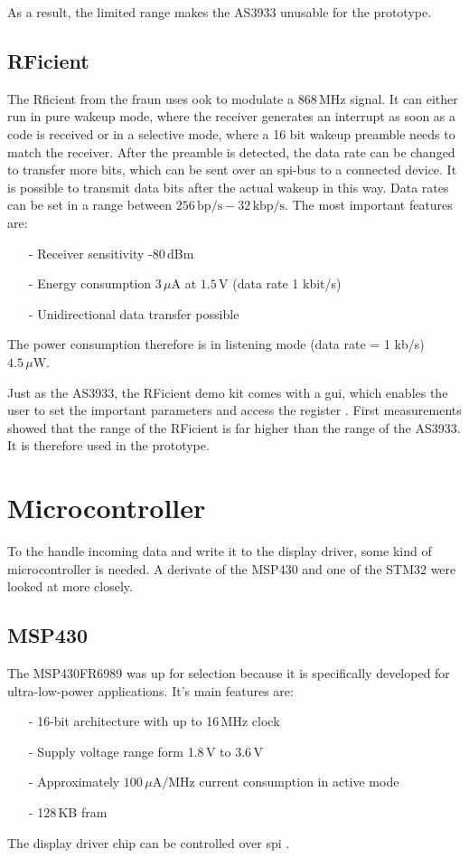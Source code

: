 As a result, the limited range makes the AS3933 unusable for the prototype. 

\subsection{RFicient}
The Rficient from the \acs{fraun} uses \acs{ook} to modulate a 868\,MHz signal.
It can either run in pure wakeup mode, where the receiver generates an interrupt as soon as a code is received or in a selective mode, where a 16 bit wakeup preamble needs to match the receiver. 
After the preamble is detected, the data rate can be changed to transfer more bits, which can be sent over an \acs{spi}-bus to a connected device.
It is possible to transmit data bits after the actual wakeup in this way.
Data rates can be set in a range between $256\,\text{bp/s}-32\,\text{kbp/s}$.
The most important features are:
\begin{itemize}
	\item[-] Receiver sensitivity -80\,dBm
	\item[-] Energy consumption $3\,\mu\text{A}$ at $1.5\,\text{V}$ (data rate 1 kbit/s)
	\item[-] Unidirectional data transfer possible	
\end{itemize}
The power consumption therefore is in listening mode (data rate = 1 kb/s) $4.5\,\mu\text{W}$.

Just as the AS3933, the RFicient demo kit comes with a \acs{gui}, which enables the user to set the important parameters and access the register \cite{rficient}.
First measurements showed that the range of the RFicient is far higher than the range of the AS3933.
It is therefore used in the prototype.

\section{Microcontroller}
To the handle incoming data and write it to the display driver, some kind of microcontroller is needed.
A derivate of the MSP430 and one of the STM32 were looked at more closely.

\subsection{MSP430}
The MSP430FR6989 was up for selection because it is specifically developed for ultra-low-power applications.
It's main features are:
\begin{itemize}
	\item[-] 16-bit architecture with up to 16\,MHz clock
	\item[-] Supply voltage range form 1.8\,V to 3.6\,V
	\item[-] Approximately  $100\,\mu\text{A}/\text{MHz}$ current consumption in active mode
	\item[-] 128\,KB \acf{fram}
\end{itemize}
The display driver chip can be controlled over \acs{spi}  \cite{msp430}.

